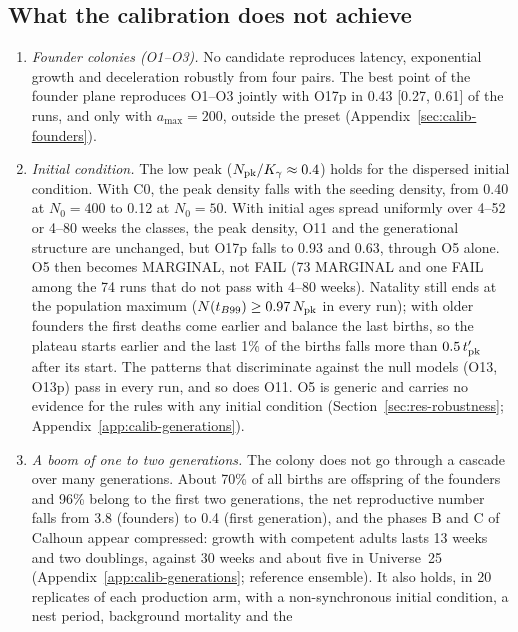 \subsection{What the calibration does not achieve}
\label{sec:calib-limits}

\begin{enumerate}
  \item \emph{Founder colonies (O1--O3).} No candidate reproduces latency, exponential growth and
    deceleration robustly from four pairs. The best point of the founder plane reproduces O1--O3 jointly with O17p
    in 0.43 [0.27, 0.61] of the runs, and only with $a_{\max}=200$, outside the preset
    (Appendix~\ref{sec:calib-founders}).
  \item \emph{Initial condition.} The low peak ($N_{\rm pk}/K_\gamma\approx0.4$) holds for the
    dispersed initial condition. With \textsf{C0}, the peak density falls with the seeding
    density, from 0.40 at $N_0=400$ to 0.12 at $N_0=50$. With initial ages spread uniformly over 4--52 or 4--80
    weeks the classes, the peak density, O11 and the generational structure are unchanged, but O17p falls to 0.93
    and 0.63, through O5 alone. O5 then becomes MARGINAL, not FAIL (73 MARGINAL and one FAIL among the 74 runs
    that do not pass with 4--80 weeks). Natality still ends at the population maximum ($N(t_{B99})\ge0.97\,N_{\rm pk}$
    in every run); with older founders the first deaths come earlier and balance the last births, so the plateau
    starts earlier and the last 1\% of the births falls more than $0.5\,t'_{\rm pk}$ after its start. The patterns
    that discriminate against the null models (O13, O13p) pass in every run, and so does O11. O5 is generic and carries no
    evidence for the rules with any initial condition (Section~\ref{sec:res-robustness};
    Appendix~\ref{app:calib-generations}).
  \item \emph{A boom of one to two generations.} The colony does not go through a cascade over many generations.
    About 70\% of all births are offspring of the founders and 96\% belong to the first two generations, the net
    reproductive number falls from 3.8 (founders) to 0.4 (first generation), and the phases B and C of Calhoun appear
    compressed: growth with competent adults lasts 13 weeks and two doublings, against 30 weeks and about five in
    Universe~25 (Appendix~\ref{app:calib-generations}; reference ensemble). It also holds, in 20 replicates of each
    production arm, with a non-synchronous initial condition, a nest period, background mortality and the

\end{enumerate}
